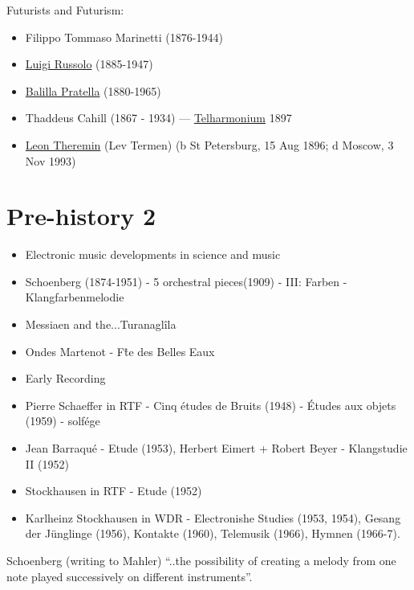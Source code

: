 Futurists and Futurism:
\begin{itemize}
\item Filippo Tommaso Marinetti (1876-1944)
\item \href{http://www.grovemusic.com/shared/views/article.html?section=music.24174}{Luigi Russolo} (1885-1947)
\item \href{http://www.grovemusic.com/shared/views/article.html?from=search&session_search_id=1013432510&session_name=f64e02b451f7a922&hitnum=4&section=music.22259&start=1&query=marinetti&search_subview=search_subject}{Balilla Pratella} (1880-1965)
\end{itemize}

\begin{itemize}
\item Thaddeus Cahill (1867 - 1934) --- \href{http://www.grovemusic.com/shared/views/article.html?section=music.46183}{Telharmonium} 1897
\item \href{http://www.grovemusic.com/shared/views/article.html?section=music.45834}{Leon Theremin} (Lev Termen) (b St Petersburg, 15 Aug 1896; d Moscow, 3 Nov 1993)
\end{itemize}

\section{Pre-history 2}
\begin{itemize}
\item Electronic music developments in science and music
\item Schoenberg (1874-1951) - 5 orchestral pieces(1909) - III: Farben - Klangfarbenmelodie
\item Messiaen and the...Turanaglîla
\item Ondes Martenot - F\^te des Belles Eaux
\item Early Recording
\item Pierre Schaeffer in RTF - Cinq \'etudes de Bruits (1948) - \'Etudes aux objets (1959) - solfége
\item Jean Barraqu\'e - Etude (1953), Herbert Eimert + Robert Beyer - Klangstudie II (1952)
\item Stockhausen in RTF - Etude (1952)
\item Karlheinz Stockhausen in WDR - Electronishe Studies (1953, 1954), Gesang der J\"unglinge (1956), Kontakte (1960), Telemusik (1966), Hymnen (1966-7).
\end{itemize}

Schoenberg (writing to Mahler) ``..the possibility of creating a melody from one note played successively on different instruments''.

